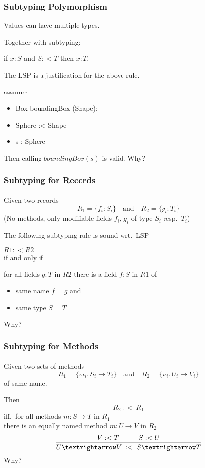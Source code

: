 \documentclass{beamer}
\begin{document}
\begin{frame}
\frametitle{Subtyping Polymorphism}

\begin{definition}[Polymorphism]
   Values can have multiple types.
\end{definition}

Together with subtyping:
\begin{center}
  if $x : S$ and $S :< T$ then $x : T$.
\end{center}
The LSP is a justification for the above rule.

\begin{example}
  assume: 
  \begin{itemize}
  \item Box boundingBox (Shape);
  \item Sphere :< Shape
  \item s : Sphere
  \end{itemize}
  Then calling $boundingBox(s)$ is valid. Why?  
\end{example}

\end{frame}

\begin{frame}
\frametitle{Subtyping for Records}
\framesubtitle{}

Given two records 
\[ 
   R_1 = \{f_i : S_i\} \quad \text{and} \quad R_2 = \{g_i : T_i\}
\]
(No methods, only modifiable fields $f_i$, $g_i$ of type $S_i$ resp.\ $T_i$)

\pause

The following subtyping rule is sound wrt.\ LSP

\begin{center}
  $R1 :< R2$\\[0.5em]
  if and only if \\[0.5em]
  \begin{minipage}{0.75\textwidth}
    for all fields $g:T$ in $R2$ there is a field $f:S$ in $R1$ of
    \begin{itemize}
    \item same name $f=g$ and
    \item same type $S=T$
    \end{itemize}
  \end{minipage}
\end{center}
   
Why?

\end{frame}


\begin{frame}
\frametitle{Subtyping for Methods}
\framesubtitle{}

Given two sets of methods \[
   R_1=\{m_i : S_i \rightarrow T_i\} \quad \text{and}\quad R_2=\{n_i :U_i \rightarrow V_i\}
\]
of same name.\medskip\pause

Then 
\[R_2~:<~R_1\]
iff.\ for all methods $m:S\rightarrow T$ in $R_1$\\ 
there is an equally named method $m: U\rightarrow V$ in $R_2$\hfill 
\[
\frac{\; V :< T \mbox{\hspace{1cm}}  S :< U \;}{U → V \; :< \; S → T}
\]
Why?

\end{frame}
\end{document}
